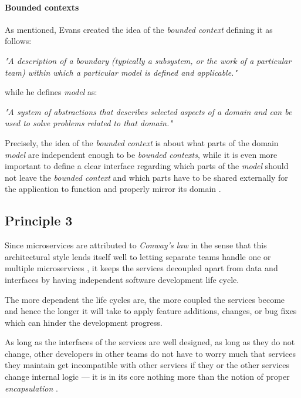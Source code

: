 \documentclass[12pt,a4paper]{report}
\begin{document}
\paragraph{Bounded contexts}
As mentioned, Evans created the idea of the \textit{bounded context} defining
it as follows:
\begin{displayquote}
\emph{"A description of a boundary
(typically a subsystem, or the work of a particular team)
within which a particular model is defined and applicable."}~\cite{evans2014ddd}
\end{displayquote}
while he defines \textit{model} as:
\begin{displayquote}
\emph{"A system of abstractions that describes selected aspects of a domain
and can be used to solve problems related to that domain."}~\cite{evans2014ddd}
\end{displayquote}
Precisely, the idea of the \textit{bounded context} is about what parts of the
domain \textit{model} are independent enough to be \textit{bounded contexts},
while it is even more important to define a clear interface regarding
which parts of the \textit{model} should not leave the \textit{bounded context}
and which parts have to be shared externally for the application to function
and properly mirror its domain \cite{newman2015building}.


\subsection{Principle 3}
Since microservices are attributed to \textit{Conway's law}
\cite{ms-fowler, dragoni2017microservices, conway1968law}
in the sense that this architectural style lends itself well to letting
separate teams handle one or multiple microservices \cite{newman2015building},
it keeps the services decoupled apart from data and interfaces by having
independent software development life cycle.

The more dependent the life cycles are, the more coupled the services become
and hence the longer it will take to apply feature additions, changes,
or bug fixes which can hinder the development progress.

As long as the interfaces of the services are well designed,
as long as they do not change, other developers in other teams do not have
to worry much that services they maintain get incompatible with other services
if they or the other services change internal logic --- it is in its core
nothing more than the notion of proper \textit{encapsulation} \cite{ms-fowler}.
\end{document}
